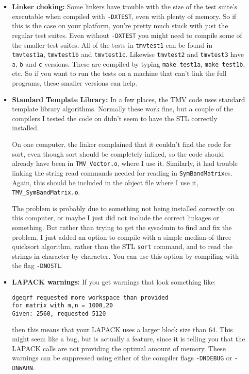 \documentclass[twoside,letterpaper,11pt]{article}
\renewcommand{\tt}[1]{{\texttt {#1}}}
\begin{document}
\begin{itemize}
\item {\bf Linker choking:}
Some linkers have trouble with the size 
of the test suite's executable when compiled 
with \tt{-DXTEST}, even with plenty of memory.  So if this is the case on your platform, 
you're pretty much stuck with just the regular test suites.  Even without \tt{-DXTEST}
you might need to compile some of the smaller test suites.  All of the tests
in \tt{tmvtest1} can be found in \tt{tmvtest1a}, \tt{tmvtest1b} and \tt{tmvtest1c}.
Likewise \tt{tmvtest2} and \tt{tmvtest3} have \tt{a}, \tt{b} and \tt{c} versions.  These are 
compiled by typing \tt{make test1a}, \tt{make test1b}, etc.  So if you want
to run the tests on a machine that can't link the full programs, these
smaller versions can help.

\item {\bf Standard Template Library:}
In a few places, the TMV code uses standard template library algorithms.
Normally these work fine, but a couple of the compilers I tested the code on
didn't seem to have the STL correctly installed. 

On one computer, the linker complained 
that it couldn't find the code for sort, even though sort should be completely inlined,
so the code should already have been in \tt{TMV\_Vector.o}, where I use it.
Similarly, it had trouble linking the string read commands needed for reading
in \tt{SymBandMatrix}es.  Again, this should be included in the object file where 
I use it, \tt{TMV\_SymBandMatrix.o}.

The problem is probably due to something not being installed correctly on this
computer, or maybe I just did not include the correct linkages or something.  
But rather than trying to get the sysadmin to find and fix the problem, 
I just added an option to compile with a simple median-of-three
quicksort algorithm, rather than the STL \tt{sort} command, and to read the strings
in character by character.  You can use this option by compiling with the 
flag \tt{-DNOSTL}.  

\item {\bf LAPACK warnings:}
If you get warnings 
that look something like:
\begin{verbatim}
dgeqrf requested more workspace than provided 
for matrix with m,n = 1000,20 
Given: 2560, requested 5120
\end{verbatim}
then this means that your LAPACK uses a larger block size than 64.  
This might seem like a bug, but is actually a feature, since it is telling you
that the LAPACK calls are not providing the optimal amount of memory.
These warnings can be suppressed using either of the compiler flags
\tt{-DNDEBUG} or \tt{-DNWARN}.


\end{itemize}
\end{document}
